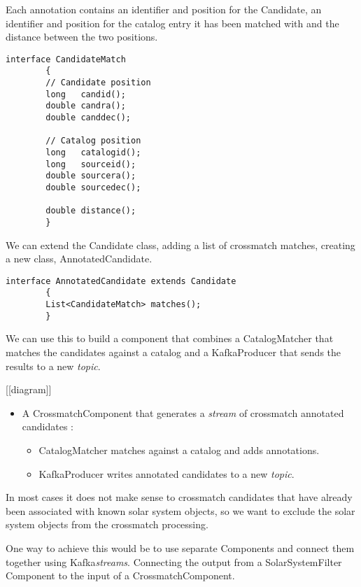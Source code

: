 \documentclass{article}
\newcommand{\kafka} {Kafka\xspace}
\newcommand{\kftopic} {\textit{topic}\xspace}
\newcommand{\kfstream} {\textit{stream}\xspace}
\newcommand{\kfstreams} {\textit{streams}\xspace}
\newcommand{\crossmatch} {crossmatch\xspace}
\newcommand{\javaname}[1] {{\ttfamily\color{codeblue} #1}}
\newcommand{\javaplural}[1] {\javaname{#1}s}
\begin{document}
Each annotation contains an identifier and position for the \javaname{Candidate}, an identifier and position for the catalog entry it has been matched with and the distance between the two positions.

\begin{lstlisting}[style=Java]
    interface CandidateMatch
        {
        // Candidate position
        long   candid();
        double candra();
        double canddec();

        // Catalog position
        long   catalogid();
        long   sourceid();
        double sourcera();
        double sourcedec();

        double distance();
        }
\end{lstlisting}

We can extend the \javaname{Candidate} class, adding a list of \crossmatch matches, creating a new class, \javaname{AnnotatedCandidate}.

\begin{lstlisting}[style=Java]
    interface AnnotatedCandidate extends Candidate
        {
        List<CandidateMatch> matches();
        }
\end{lstlisting}

We can use this to build a component that combines a \javaname{CatalogMatcher} that matches the candidates against a catalog and a \javaname{KafkaProducer} that sends the results to a new \kftopic.

[[diagram]]
\begin{itemize}
    \item A \javaname{CrossmatchComponent} that generates a \kfstream of \crossmatch annotated candidates :
    \begin{itemize}
        \item \javaname{CatalogMatcher} matches against a catalog and adds annotations.
    \end{itemize}
    \begin{itemize}
        \item \javaname{KafkaProducer} writes annotated candidates to a new \kftopic.
    \end{itemize}
\end{itemize}

In most cases it does not make sense to \crossmatch candidates that have already been associated with known solar system objects, so we want to exclude the solar system objects from the \crossmatch processing.

One way to achieve this would be to use separate \javaplural{Component} and connect them together using \kafka \kfstreams. Connecting the output from a \javaname{SolarSystemFilter} \javaname{Component} to the input of a \javaname{CrossmatchComponent}.
\end{document}
